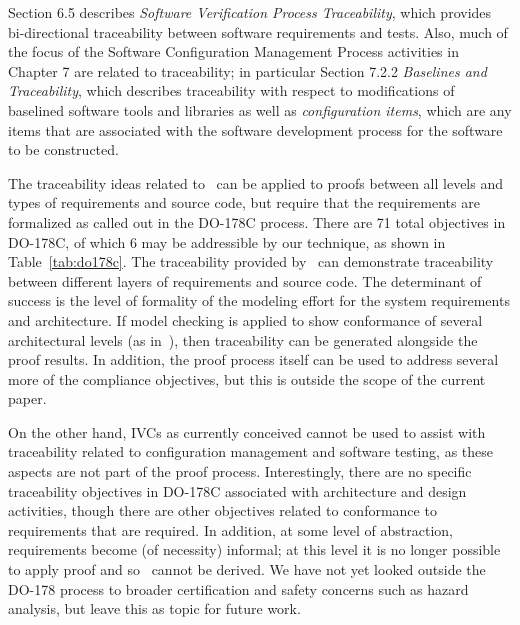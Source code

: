 
Section 6.5 describes {\em Software Verification Process Traceability}, which provides bi-directional traceability between software requirements and tests.  Also, much of the focus of the Software Configuration Management Process activities in Chapter 7 are related to traceability; in particular Section 7.2.2 {\em Baselines and Traceability}, which describes traceability with respect to modifications of baselined software tools and libraries as well as {\em configuration items}, which are any items that are associated with the software development process for the software to be constructed.

The traceability ideas related to \mivcs\ can be applied to proofs between all levels and types of requirements and source code, but require that the requirements are formalized as called out in the DO-178C process.  There are 71 total objectives in DO-178C, of which 6 may be addressible by our technique, as shown in Table~\ref{tab:do178c}.  The traceability provided by \mivcs\ can demonstrate traceability between different layers of requirements and source code.  The determinant of success is the level of formality of the modeling effort for the system requirements and architecture.  If model checking is applied to show conformance of several architectural levels (as in~\cite{QFCS15:backes,hilt2013}), then traceability can be generated alongside the proof results.   In addition, the proof process itself can be used to address several more of the compliance objectives, but this is outside the scope of the current paper.

On the other hand, IVCs as currently conceived cannot be used to assist with traceability related to configuration management and software testing, as these aspects are not part of the proof process.  Interestingly, there are no specific traceability objectives in DO-178C associated with architecture and design activities, though there are other objectives related to conformance to requirements that are required.  In addition, at some level of abstraction, requirements become (of necessity) informal; at this level it is no longer possible to apply proof and so \mivcs\ cannot be derived.  We have not yet looked outside the DO-178 process to broader certification and safety concerns such as hazard analysis, but leave this as topic for future work.

